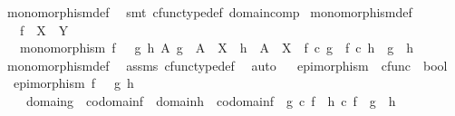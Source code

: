\begin{isabellebody}
\ monomorphism{\isacharunderscore}{\kern0pt}def\ \isamarkupfalse%
\ {\isacharparenleft}{\kern0pt}smt\ cfunc{\isacharunderscore}{\kern0pt}type{\isacharunderscore}{\kern0pt}def\ domain{\isacharunderscore}{\kern0pt}comp{\isacharparenright}{\kern0pt}%
\endisatagproof
{\isafoldproof}%
%
\isadelimproof
\isanewline
%
\endisadelimproof
\isanewline
{}\isamarkupfalse%
\ monomorphism{\isacharunderscore}{\kern0pt}def{}{\isacharcolon}{\kern0pt}\isanewline
\ \ \ {\isachardoublequoteopen}f\ {\isacharcolon}{\kern0pt}\ X\ {\isasymrightarrow}\ Y{\isachardoublequoteclose}\isanewline
\ \ \ {\isachardoublequoteopen}monomorphism\ f\ {\isasymlongleftrightarrow}\ {\isacharparenleft}{\kern0pt}{\isasymforall}\ g\ h\ A{\isachardot}{\kern0pt}\ g\ {\isacharcolon}{\kern0pt}\ A\ {\isasymrightarrow}\ X\ {\isasymand}\ h\ {\isacharcolon}{\kern0pt}\ A\ {\isasymrightarrow}\ X\ {\isasymlongrightarrow}\ {\isacharparenleft}{\kern0pt}f\ {\isasymcirc}\isactrlsub c\ g\ {\isacharequal}{\kern0pt}\ f\ {\isasymcirc}\isactrlsub c\ h\ {\isasymlongrightarrow}\ g\ {\isacharequal}{\kern0pt}\ h{\isacharparenright}{\kern0pt}{\isacharparenright}{\kern0pt}{\isachardoublequoteclose}\isanewline
%
\isadelimproof
\ \ %
\endisadelimproof
%
\isatagproof
{}\isamarkupfalse%
\ monomorphism{\isacharunderscore}{\kern0pt}def{}\ \isamarkupfalse%
\ assms\ cfunc{\isacharunderscore}{\kern0pt}type{\isacharunderscore}{\kern0pt}def\ \isamarkupfalse%
\ auto%
\endisatagproof
{\isafoldproof}%
%
\isadelimproof
\ \isanewline
%
\endisadelimproof
\isanewline
{}\isamarkupfalse%
\ epimorphism\ {\isacharcolon}{\kern0pt}{\isacharcolon}{\kern0pt}\ {\isachardoublequoteopen}cfunc\ {\isasymRightarrow}\ bool{\isachardoublequoteclose}\ \isanewline
\ \ {\isachardoublequoteopen}epimorphism\ f\ {\isasymlongleftrightarrow}\ {\isacharparenleft}{\kern0pt}{\isasymforall}\ g\ h{\isachardot}{\kern0pt}\ \isanewline
\ \ \ \ {\isacharparenleft}{\kern0pt}domain{\isacharparenleft}{\kern0pt}g{\isacharparenright}{\kern0pt}\ {\isacharequal}{\kern0pt}\ codomain{\isacharparenleft}{\kern0pt}f{\isacharparenright}{\kern0pt}\ {\isasymand}\ domain{\isacharparenleft}{\kern0pt}h{\isacharparenright}{\kern0pt}\ {\isacharequal}{\kern0pt}\ codomain{\isacharparenleft}{\kern0pt}f{\isacharparenright}{\kern0pt}{\isacharparenright}{\kern0pt}\ {\isasymlongrightarrow}\ {\isacharparenleft}{\kern0pt}g\ {\isasymcirc}\isactrlsub c\ f\ {\isacharequal}{\kern0pt}\ h\ {\isasymcirc}\isactrlsub c\ f\ {\isasymlongrightarrow}\ g\ {\isacharequal}{\kern0pt}\ h{\isacharparenright}{\kern0pt}{\isacharparenright}{\kern0pt}{\isachardoublequoteclose}\isanewline

\end{isabellebody}
